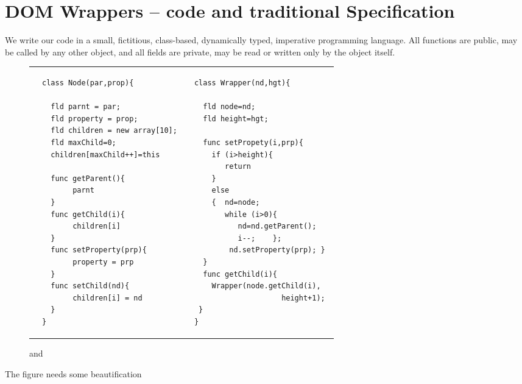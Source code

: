 \section{DOM Wrappers -- code and traditional Specification}
\label{DOM:traditional}


We write our code in a small, fictitious, class-based, dynamically
typed, imperative programming language. All functions are public, \ie
may be called by any other object, and all fields are private, \ie may
be read or written only by the object itself. 

\begin{figure}[htb]
\begin{tabular}{llll}
&
\begin{minipage}{0.45\textwidth}
\begin{lstlisting}
class Node(par,prop){

  fld parnt = par;
  fld property = prop;
  fld children = new array[10];
  fld maxChild=0;
  children[maxChild++]=this
  
  func getParent(){
       parnt 
  }  
  func getChild(i){
       children[i] 
  }
  func setProperty(prp){
       property = prp 
  }  
  func setChild(nd){
       children[i] = nd
  }  
}
\end{lstlisting}
\end{minipage}
& & 
\begin{minipage}{0.40\textwidth}
\begin{lstlisting}
class Wrapper(nd,hgt){

  fld node=nd;
  fld height=hgt;

  func setPropety(i,prp){
    if (i>height){ 
       return 
    } 
    else  
    {  nd=node;  
       while (i>0){
          nd=nd.getParent();
          i--;    };
        nd.setProperty(prp); }
  }    
  func getChild(i){ 
    Wrapper(node.getChild(i),
                    height+1); 
 }                           
}
\end{lstlisting}
\end{minipage}
\end{tabular}
 \vspace*{-7mm}
\caption{  and  }
\label{fig:DOM}
\end{figure}

The figure needs some beautification

